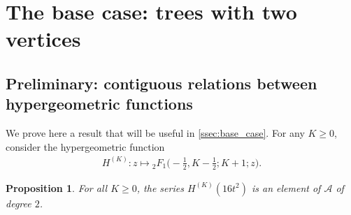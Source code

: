\documentclass[12pt]{amsart}
\theoremstyle{plain}
\newtheorem{proposition}[lemma]{Proposition}
\theoremstyle{remark}
\def\cA{\mathcal{A}}
\begin{document}
\section{The base case: trees with two vertices}
\label{sec:base_case}

\subsection{Preliminary: contiguous relations between hypergeometric functions}
\label{ssec:relations}

We prove here a result that will be useful in \cref{ssec:base_case}.
For any $K \geq 0$, consider the hypergeometric function
\begin{align*}
H^{(K)}: z \mapsto {}_{2}^{}{{}{{}{F_{1}^{}}}}\big(-\tfrac12, K-\tfrac12 ; K+1 ; z\big).
\end{align*}

\begin{proposition}
\label{prop:contiguous}
For all $K \geq 0$, the series $H^{(K)}(16t^2)$ is an element of $\cA$ of degree $2$.
\end{proposition}
\end{document}
